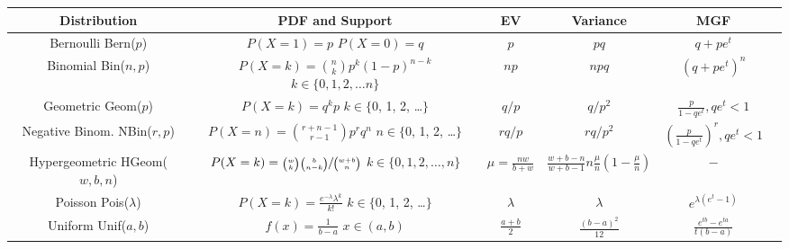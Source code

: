 \documentclass[10pt,landscape]{article}
\theoremstyle{definition}
\newcommand{\Bern}{\textrm{Bern}}
\newcommand{\Bin}{\textrm{Bin}}
\newcommand{\Pois}{\textrm{Pois}}
\newcommand{\Unif}{\textrm{Unif}}
\newcommand{\Geom}{\textrm{Geom}}
\newcommand{\NBin}{\textrm{NBin}}
\newcommand{\Hypergeometric}{\textrm{HGeom}}
\begin{document}
\begin{sidewaystable}

    \begin{center}
    \renewcommand{\arraystretch}{3}
    \begin{tabular}{cccccc}
    \textbf{Distribution} & \textbf{PDF and Support} & \textbf{EV}  & \textbf{Variance} & \textbf{MGF}\\
    \hline \hline
    \shortstack{Bernoulli \\ \Bern($p$)} & \shortstack{$P(X=1) = p$ \\$ P(X=0) = q$} & $p$ & $pq$ & $q + pe^t$ \\
    \hline
    \shortstack{Binomial \\ \Bin($n, p$)} & \shortstack{$P(X=k) = {n \choose k}p^k(1-p)^{n-k}$  \\ $k \in \{0, 1, 2, \dots n\}$}& $np$ & $npq$ & $(q + pe^t)^n$ \\
    \hline
    \shortstack{Geometric \\ \Geom($p$)} & \shortstack{$P(X=k) = q^kp$  \\ $k \in \{$0, 1, 2, \dots $\}$}& $q/p$ & $q/p^2$ & $\frac{p}{1-qe^t}, qe^t < 1$\\
    \hline
    \shortstack{Negative Binom. \\ \NBin($r, p$)} & \shortstack{$P(X=n) = {r + n - 1 \choose r -1}p^rq^n$ \\ $n \in \{$0, 1, 2, \dots $\}$} & $rq/p$ & $rq/p^2$ &  $(\frac{p}{1-qe^t})^r, qe^t < 1$\\
    \hline
    \shortstack{Hypergeometric \\ \Hypergeometric($w, b, n$)} & \shortstack{$P(X=k) = \sfrac{{w \choose k}{b \choose n-k}}{{w + b \choose n}}$ \\ $k \in \{0, 1, 2, \dots,  n\}$} & $\mu = \frac{nw}{b+w}$ &$\frac{w+b-n}{w+b-1}n\frac{\mu}{n}(1 - \frac{\mu}{n})$& $-$  \\
    \hline
    \shortstack{Poisson \\ \Pois($\lambda$)} & \shortstack{$P(X=k) = \frac{e^{-\lambda}\lambda^k}{k!}$ \\ $k \in \{$0, 1, 2, \dots $\}$} & $\lambda$ & $\lambda$ & $e^{\lambda(e^t-1)}$ \\
    \hline
    \hline
    \shortstack{Uniform \\ \Unif($a, b$)} & \shortstack{$ f(x) = \frac{1}{b-a}$ \\$ x \in (a, b) $} & $\frac{a+b}{2}$ & $\frac{(b-a)^2}{12}$ &  $\frac{e^{tb}-e^{ta}}{t(b-a)}$\\

\end{tabular}
\end{center}
\end{sidewaystable}
\end{document}
